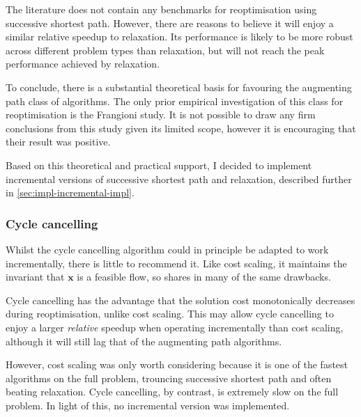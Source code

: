 The literature does not contain any benchmarks for reoptimisation using successive shortest path. However, there are reasons to believe it will enjoy a similar relative speedup to relaxation. Its performance is likely to be more robust across different problem types than relaxation, but will not reach the peak performance achieved by relaxation.

To conclude, there is a substantial theoretical basis for favouring the augmenting path class of algorithms. The only prior empirical investigation of this class for reoptimisation is the Frangioni study. It is not possible to draw any firm conclusions from this study given its limited scope, however it is encouraging that their result was positive.

Based on this theoretical and practical support, I decided to implement incremental versions of successive shortest path and relaxation, described further in \cref{sec:impl-incremental-impl}.

\subsubsection{Cycle cancelling}

Whilst the cycle cancelling algorithm could in principle be adapted to work incrementally, there is little to recommend it. Like cost scaling, it maintains the invariant that $\mathbf{x}$ is a feasible flow, so shares in many of the same drawbacks.  

Cycle cancelling has the advantage that the solution cost monotonically decreases during reoptimisation, unlike cost scaling\footnotemark. This may allow cycle cancelling to enjoy a larger \emph{relative} speedup when operating incrementally than cost scaling, although it will still lag that of the augmenting path algorithms.

However, cost scaling was only worth considering because it is one of the fastest algorithms on the full problem, trouncing successive shortest path and often beating relaxation. Cycle cancelling, by contrast, is extremely slow on the full problem. In light of this, no incremental version was implemented.

